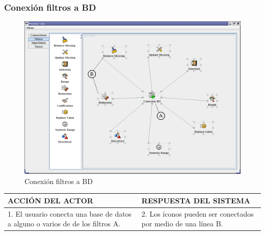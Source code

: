 \subsubsection{Conexi\'on filtros a BD}
\begin{figure}[ht]
\centering
\includegraphics[width=1\textwidth]{images/19.png}
\caption{Conexi\'on filtros a BD}
\end{figure}
\begin{center}
\begin{tabular}{|p{60mm}|p{60mm}|} \hline
ACCI\'ON DEL ACTOR & RESPUESTA DEL SISTEMA \\ \hline
1. El usuario conecta una base de datos a alguno o varios de de los filtros A. & 2. Los \'iconos pueden ser conectados por medio de una l\'inea B.\\ \hline
\end{tabular}
\end{center}

\newpage
